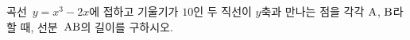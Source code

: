 곡선~$y=x^3-2x$에 접하고 기울기가 $10$인 두 직선이 $y$축과 만나는 점을 각각 $\mathrm{A}$, $\mathrm{B}$라 할 때, 선분~$\mathrm{AB}$의 길이를 구하시오.
